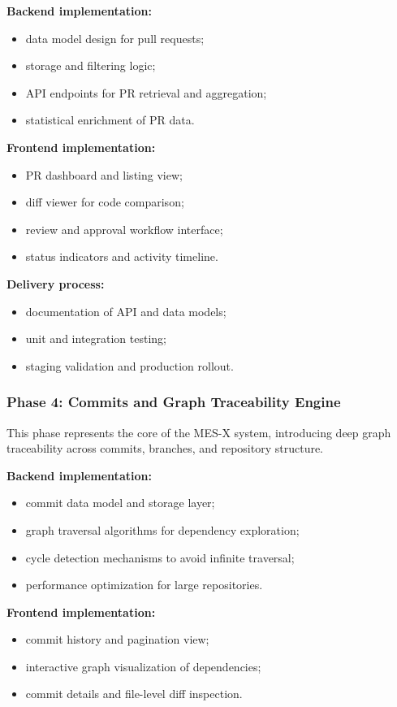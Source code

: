 \textbf{Backend implementation:}
\begin{itemize}
  \item data model design for pull requests;
  \item storage and filtering logic;
  \item API endpoints for PR retrieval and aggregation;
  \item statistical enrichment of PR data.
\end{itemize}

\textbf{Frontend implementation:}
\begin{itemize}
  \item PR dashboard and listing view;
  \item diff viewer for code comparison;
  \item review and approval workflow interface;
  \item status indicators and activity timeline.
\end{itemize}

\textbf{Delivery process:}
\begin{itemize}
  \item documentation of API and data models;
  \item unit and integration testing;
  \item staging validation and production rollout.
\end{itemize}

\subsubsection{Phase 4: Commits and Graph Traceability Engine}

This phase represents the core of the MES-X system, introducing deep graph
traceability across commits, branches, and repository structure.

\textbf{Backend implementation:}
\begin{itemize}
  \item commit data model and storage layer;
  \item graph traversal algorithms for dependency exploration;
  \item cycle detection mechanisms to avoid infinite traversal;
  \item performance optimization for large repositories.
\end{itemize}

\textbf{Frontend implementation:}
\begin{itemize}
  \item commit history and pagination view;
  \item interactive graph visualization of dependencies;
  \item commit details and file-level diff inspection.
\end{itemize}


